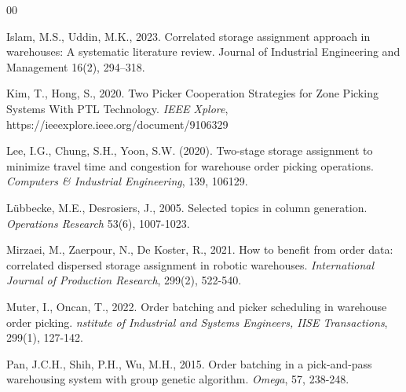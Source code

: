 \documentclass[preprint,review,11pt,authoryear]{elsarticle}
\begin{document}
\begin{thebibliography}{00}


Islam, M.S., Uddin, M.K., 2023. Correlated storage assignment approach in warehouses: A systematic literature review. Journal of Industrial Engineering and Management 16(2), 294--318.

Kim, T., Hong, S., 2020. Two Picker Cooperation Strategies for Zone
Picking Systems With PTL Technology. \textit{IEEE Xplore}, https://ieeexplore.ieee.org/document/9106329

Lee, I.G., Chung, S.H., Yoon, S.W. (2020).
Two-stage storage assignment to minimize travel time and congestion for warehouse order picking operations.
\textit{Computers \& Industrial Engineering}, 139, 106129.


L{\"u}bbecke, M.E., Desrosiers, J., 2005. Selected topics in column generation.
\textit{Operations Research} 53(6), 1007-1023. 

Mirzaei, M., Zaerpour, N., De Koster, R., 2021. How to benefit from order data: correlated dispersed storage assignment in robotic warehouses. \textit{International Journal of Production Research}, 299(2), 522-540.

Muter, I., Oncan, T., 2022. Order batching and picker scheduling in warehouse order picking. \textit{nstitute of Industrial and Systems Engineers, IISE Transactions}, 299(1), 127-142.


Pan, J.C.H., Shih, P.H., Wu, M.H., 2015. Order batching in a pick-and-pass warehousing system with group genetic algorithm. \textit{Omega}, 57, 238-248.


\end{thebibliography}
\end{document}
